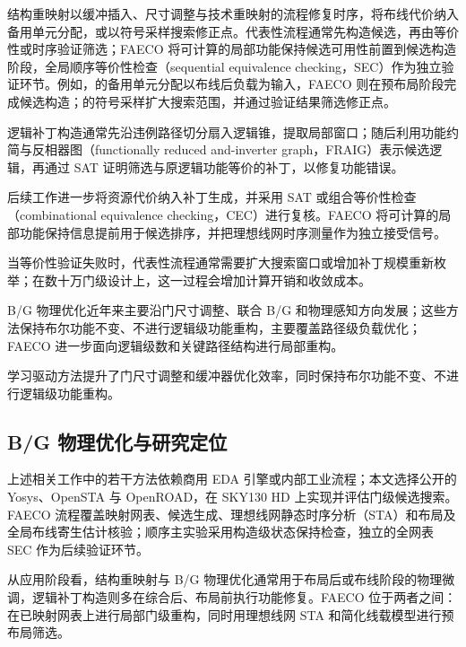 \documentclass[twocolumn,10pt,fontset=windows]{ctexart}
\begin{document}
结构重映射以缓冲插入、尺寸调整与技术重映射的流程修复时序，将布线代价纳入备用单元分配\cite{ho2010eco}，或以符号采样搜索修正点\cite{kravets2019symbolic}。代表性流程通常先构造候选，再由等价性或时序验证筛选；FAECO 将可计算的局部功能保持候选可用性前置到候选构造阶段，全局顺序等价性检查（sequential equivalence checking，SEC）作为独立验证环节。例如，\cite{ho2010eco}的备用单元分配以布线后负载为输入，FAECO 则在预布局阶段完成候选构造；\cite{kravets2019symbolic}的符号采样扩大搜索范围，并通过验证结果筛选修正点。

逻辑补丁构造通常先沿违例路径切分扇入逻辑锥，提取局部窗口；随后利用功能约简与反相器图（functionally reduced and-inverter graph，FRAIG）表示候选逻辑，再通过 SAT 证明筛选与原逻辑功能等价的补丁，以修复功能错误\cite{jiang2010fraig,jiang2016resource}。

后续工作进一步将资源代价纳入补丁生成，并采用 SAT 或组合等价性检查（combinational equivalence checking，CEC）进行复核\cite{jiang2016resource,zhong2024stp}。FAECO 将可计算的局部功能保持信息提前用于候选排序，并把理想线网时序测量作为独立接受信号。

当等价性验证失败时，代表性流程通常需要扩大搜索窗口或增加补丁规模重新枚举\cite{zhuo2018patch}；在数十万门级设计上，这一过程会增加计算开销和收敛成本。

B/G 物理优化近年来主要沿门尺寸调整、联合 B/G 和物理感知方向发展\cite{liu2021rlsizer,huang2025phys,chen2024aito,zhang2025buffalo}；这些方法保持布尔功能不变、不进行逻辑级功能重构，主要覆盖路径级负载优化；FAECO 进一步面向逻辑级数和关键路径结构进行局部重构。

学习驱动方法\cite{chen2024aito,zhang2025buffalo}提升了门尺寸调整和缓冲器优化效率，同时保持布尔功能不变、不进行逻辑级功能重构。

\subsection{B/G 物理优化与研究定位}
上述相关工作中的若干方法依赖商用 EDA 引擎或内部工业流程；本文选择公开的 Yosys\cite{yosys}、OpenSTA\cite{opensta} 与 OpenROAD\cite{openroad}，在 SKY130 HD\cite{sky130} 上实现并评估门级候选搜索。FAECO 流程覆盖映射网表、候选生成、理想线网静态时序分析（STA）和布局及全局布线寄生估计核验；顺序主实验采用构造级状态保持检查，独立的全网表 SEC 作为后续验证环节。

从应用阶段看，结构重映射与 B/G 物理优化通常用于布局后或布线阶段的物理微调，逻辑补丁构造则多在综合后、布局前执行功能修复。FAECO 位于两者之间：在已映射网表上进行局部门级重构，同时用理想线网 STA 和简化线载模型进行预布局筛选。
\end{document}
